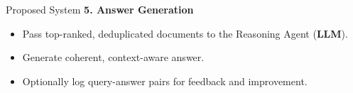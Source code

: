 \begin{frame}{Proposed System}
\textbf{5. Answer Generation}
\begin{itemize}
    \item Pass top-ranked, deduplicated documents to the Reasoning Agent (\textbf{LLM}).
    \item Generate coherent, context-aware answer.
    \item Optionally log query-answer pairs for feedback and improvement.
\end{itemize}
\end{frame}
